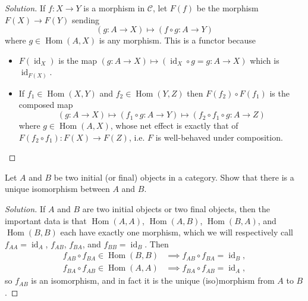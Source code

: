 \documentclass[10pt]{article}
\providecommand{\ii}{\item}
\newenvironment{soln}{\begin{proof}[Solution]}{\end{proof}}
\providecommand{\Hom}{\operatorname{Hom}}
\providecommand{\id}{\operatorname{id}}
\begin{document}
\begin{soln}
    If $f\colon X\to Y$ is a morphism in $\mathscr C$,
    let $F(f)$ be the morphism $F(X)\to F(Y)$ sending
    \begin{equation*}
	(g\colon A\to X)\mapsto(f\circ g\colon A\to Y)
    \end{equation*}
    where $g\in\Hom(A,X)$ is any morphism. This is a functor because
    \begin{itemize}
        \ii $F(\id_X)$ is the map
	$(g\colon A\to X)\mapsto(\id_X\circ g = g\colon A\to X)$
	which is $\id_{F(X)}$.
	\ii If $f_1\in\Hom(X,Y)$ and $f_2\in\Hom(Y,Z)$ then
	$F(f_2)\circ F(f_1)$ is the composed map
	\begin{equation*}
	    (g\colon A\to X)\mapsto(f_1\circ g\colon A\to Y)
	    \mapsto(f_2\circ f_1\circ g\colon A\to Z)
	\end{equation*}
	where $g\in\Hom(A,X)$, whose net effect is
	exactly that of $F(f_2\circ f_1)\colon F(X)\to F(Z)$,
	i.e. $F$ is well-behaved under composition.\qedhere
    \end{itemize}
\end{soln}

\begin{problem}
    Let $A$ and $B$ be two initial (or final) objects in a category.
    Show that there is a unique isomorphism between $A$ and $B$.
\end{problem}

\begin{soln}
    If $A$ and $B$ are two initial objects
    or two final objects, then the important data is that
    $\Hom(A,A)$, $\Hom(A,B)$, $\Hom(B,A)$, and $\Hom(B,B)$ each have
    exactly one morphism, which we will respectively call
    $f_{AA} = \id_A$, $f_{AB}$, $f_{BA}$, and $f_{BB} = \id_B$. Then
    \begin{align*}
	f_{AB}\circ f_{BA}\in\Hom(B,B)&\implies f_{AB}\circ f_{BA} = \id_B,\\
	f_{BA}\circ f_{AB}\in\Hom(A,A)&\implies f_{BA}\circ f_{AB} = \id_A,
    \end{align*}
    so $f_{AB}$ is an isomorphism,
    and in fact it is the unique (iso)morphism from $A$ to $B$.
\end{soln}
\end{document}
